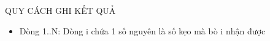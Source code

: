 QUY CÁCH GHI KẾT QUẢ
\begin{itemize}
	\item     Dòng 1..N: Dòng i chứa 1 số nguyên là số kẹo mà bò i nhận được   
\end{itemize}
